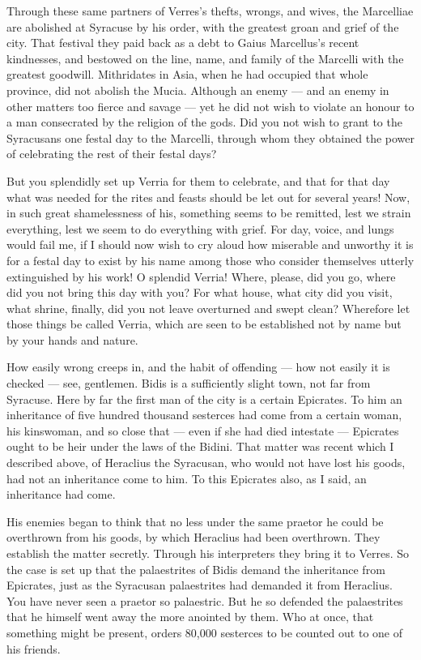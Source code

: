  Through these same partners of Verres's thefts, wrongs, and wives, the Marcelliae are abolished at Syracuse by his order, with the greatest groan and grief of the city. That festival they paid back as a debt to Gaius Marcellus's recent kindnesses, and bestowed on the line, name, and family of the Marcelli with the greatest goodwill. Mithridates in Asia, when he had occupied that whole province, did not abolish the Mucia. Although an enemy --- and an enemy in other matters too fierce and savage --- yet he did not wish to violate an honour to a man consecrated by the religion of the gods. Did you not wish to grant to the Syracusans one festal day to the Marcelli, through whom they obtained the power of celebrating the rest of their festal days?

 But you splendidly set up Verria for them to celebrate, and that for that day what was needed for the rites and feasts should be let out for several years! Now, in such great shamelessness of his, something seems to be remitted, lest we strain everything, lest we seem to do everything with grief. For day, voice, and lungs would fail me, if I should now wish to cry aloud how miserable and unworthy it is for a festal day to exist by his name among those who consider themselves utterly extinguished by his work! O splendid Verria! Where, please, did you go, where did you not bring this day with you? For what house, what city did you visit, what shrine, finally, did you not leave overturned and swept clean? Wherefore let those things be called Verria, which are seen to be established not by name but by your hands and nature.

 How easily wrong creeps in, and the habit of offending --- how not easily it is checked --- see, gentlemen. Bidis is a sufficiently slight town, not far from Syracuse. Here by far the first man of the city is a certain Epicrates. To him an inheritance of five hundred thousand sesterces had come from a certain woman, his kinswoman, and so close that --- even if she had died intestate --- Epicrates ought to be heir under the laws of the Bidini. That matter was recent which I described above, of Heraclius the Syracusan, who would not have lost his goods, had not an inheritance come to him. To this Epicrates also, as I said, an inheritance had come.

 His enemies began to think that no less under the same praetor he could be overthrown from his goods, by which Heraclius had been overthrown. They establish the matter secretly. Through his interpreters they bring it to Verres. So the case is set up that the palaestrites of Bidis demand the inheritance from Epicrates, just as the Syracusan palaestrites had demanded it from Heraclius. You have never seen a praetor so palaestric. But he so defended the palaestrites that he himself went away the more anointed by them. Who at once, that something might be present, orders 80,000 sesterces to be counted out to one of his friends.

